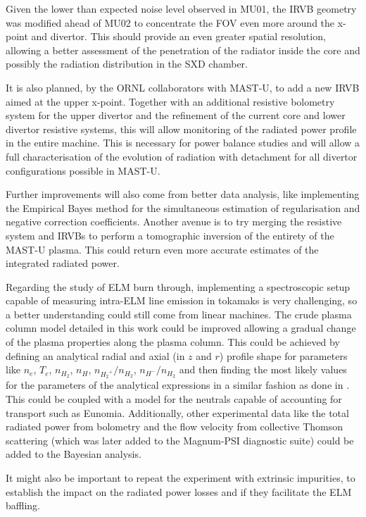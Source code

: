 Given the lower than expected noise level observed in MU01, the IRVB geometry was modified ahead of MU02 to concentrate the FOV even more around the x-point and divertor. This should provide an even greater spatial resolution, allowing a better assessment of the penetration of the radiator inside the core and possibly the radiation distribution in the SXD chamber.

It is also planned, by the ORNL collaborators with MAST-U, to add a new IRVB aimed at the upper x-point. Together with an additional resistive bolometry system for the upper divertor and the refinement of the current core and lower divertor resistive systems, this will allow monitoring of the radiated power profile in the entire machine. This is necessary for power balance studies and will allow a full characterisation of the evolution of radiation with detachment for all divertor configurations possible in MAST-U.

Further improvements will also come from better data analysis, like implementing the Empirical Bayes method for the simultaneous estimation of regularisation and negative correction coefficients. Another avenue is to try merging the resistive system and IRVBs to perform a tomographic inversion of the entirety of the MAST-U plasma. This could return even more accurate estimates of the integrated radiated power.

Regarding the study of ELM burn through, implementing a spectroscopic setup capable of measuring intra-ELM line emission in tokamaks is very challenging, so a better understanding could still come from linear machines. The crude plasma column model detailed in this work could be improved allowing a gradual change of the plasma properties along the plasma column. This could be achieved by defining an analytical radial and axial (in $z$ and $r$) profile shape for parameters like $n_e$, $T_e$, $n_{H_2}$, $n_{H}$, $n_{{H_2}^+}/n_{H_2}$, $n_{{H}^-}/n_{H_2}$ and then finding the most likely values for the parameters of the analytical expressions in a similar fashion as done in \cite{Gahle2020}. This could be coupled with a model for the neutrals capable of accounting for transport such as Eunomia. Additionally, other experimental data like the total radiated power from bolometry and the flow velocity from collective Thomson scattering (which was later added to the Magnum-PSI diagnostic suite) could be added to the Bayesian analysis.

It might also be important to repeat the experiment with extrinsic impurities, to establish the impact on the radiated power losses and if they facilitate the ELM baffling.

